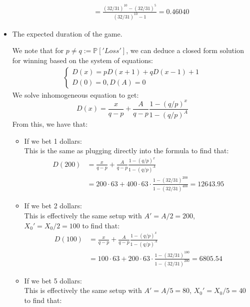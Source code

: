 \documentclass[12pt,twoside, letter]{exam}
\theoremstyle{definition}
\newcommand{\pp}{\mathbb{P}}
\begin{document}
\begin{itemize}
\begin{solution}
\begin{itemize}
\begin{align*}
                &= \frac{(32/31)^{10} - (32/31)^5}{(32/31)^{10}-1} = 0.46040
              \end{align*}
        \end{itemize}
    \end{solution}
  \item The expected duration of the game.
    \begin{solution}
      We note that for $p \neq q := \pp['Loss']$, we can deduce a closed form solution for winning
      based on the system of equations:
      \begin{align*}
        \begin{cases}
          D(x) = pD(x+1) + qD(x-1) + 1 \\
          D(0) = 0, D(A) = 0
        \end{cases}
      \end{align*}
        We solve inhomogeneous equation to get:
        \begin{equation*}
          D(x) = \frac{x}{q-p} + \frac{A}{q-p}\frac{1-(q/p)^x}{1-(q/p)^A}
        \end{equation*}
        From this, we have that:
        \begin{itemize}
          \item If we bet 1 dollars: \\
            This is the same as plugging directly into the formula to find that:
            \begin{align*}
              D(200) &= \frac{x}{q-p} + \frac{A}{q-p}\frac{1-(q/p)^x}{1-(q/p)^A} \\
              &= 200\cdot 63 + 400\cdot 63 \cdot \frac{1-(32/31)^{200}}{1-(32/31)^{400}} = 12643.95
            \end{align*}
          \item If we bet 2 dollars: \\
            This is effectively the same setup with $A' = A/2 = 200$,
            $X_0'= X_0/2 = 100$ to find that:
            \begin{align*}
              D(100) &= \frac{x}{q-p} + \frac{A}{q-p}\frac{1-(q/p)^x}{1-(q/p)^A} \\
              &= 100\cdot 63 + 200\cdot 63 \cdot \frac{1-(32/31)^{100}}{1-(32/31)^{200}} = 6805.54
            \end{align*}
          \item If we bet 5 dollars: \\
            This is effectively the same setup with $A' = A/5 = 80$,
            $X_0'= X_0/5 = 40$ to find that:

\end{itemize}
\end{solution}
\end{itemize}
\end{document}

